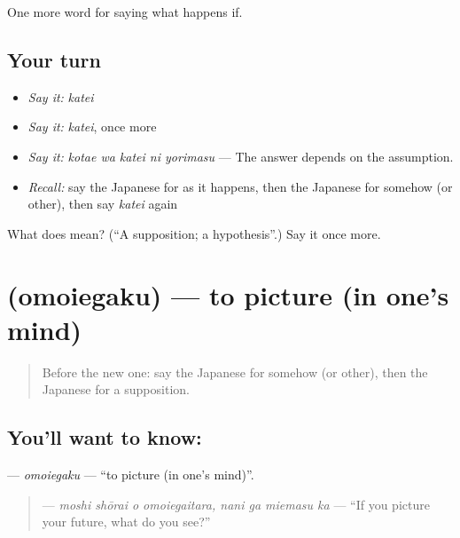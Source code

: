 \begin{grammarlens}[title={What you've built}]
One more word for saying what happens if.
\end{grammarlens}

\subsection*{Your turn}
\begin{itemize}
\raggedright
  \item \emph{Say it:} \emph{katei}
  \item \emph{Say it:} \emph{katei}, once more
  \item \emph{Say it:} \emph{kotae wa katei ni yorimasu} — The answer depends on the assumption.
  \item \emph{Recall:} say the Japanese for as it happens, then the Japanese for somehow (or other), then say \emph{katei} again
\end{itemize}

\begin{tcolorbox}[breakable,colback=teal!4,colframe=teal!35!black,title={Before you move on}]
What does  mean? (\textquotedblleft{}A supposition; a hypothesis\textquotedblright{}.) Say it once more.
\end{tcolorbox}
\section[\texorpdfstring{\ja{おもいえがく} (omoiegaku)}{おもいえがく (omoiegaku)}]{ (omoiegaku) — to picture (in one's mind)}

\label{lesson:JA-C524-omoiegaku}



\begin{quote}
Before the new one: say the Japanese for somehow (or other), then the Japanese for a supposition.
\end{quote}

\subsection*{You'll want to know: }
\textbf{} — \emph{omoiegaku} — \textquotedblleft{}to picture (in one's mind)\textquotedblright{}.

\begin{quote}
\textbf{   } — \emph{moshi shōrai o omoiegaitara, nani ga miemasu ka} — \textquotedblleft{}If you picture your future, what do you see?\textquotedblright{}
\end{quote}

